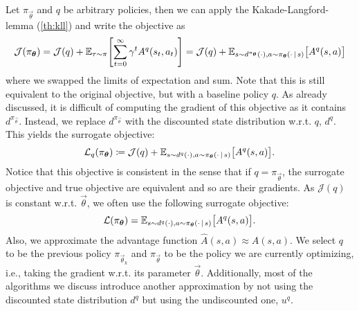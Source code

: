 		Let \(\pi_{\vec{\theta}}\) and \(q\) be arbitrary policies, then we can apply the Kakade-Langford-lemma (\autoref{th:kll}) and write the objective as
		\begin{equation}
			\mathcal{J}(\pi_{\bm{\theta}})
			= \mathcal{J}(q) + \mathbb{E}_{\tau \sim \pi}\Biggl[ \sum_{t = 0}^{\infty} \gamma^t A^q(s_t, a_t) \Biggr]
			= \mathcal{J}(q) + \mathbb{E}_{s \sim d^{\pi_{\bm{\theta}}}(\cdot), a \sim \pi_{\bm{\theta}}(\cdot \,\vert\, s)}\bigl[ A^q(s, a) \bigr]
		\end{equation}
		where we swapped the limits of expectation and sum. Note that this is still equivalent to the original objective, but with a baseline policy \(q\). As already discussed, it is difficult of computing the gradient of this objective as it contains \(d^{\pi_{\vec{\theta}}}\). Instead, we replace \(d^{\pi_{\vec{\theta}}}\) with the discounted state distribution w.r.t. \(q\), \(d^q\). This yields the surrogate objective:
		\begin{equation}
			\mathcal{L}_q(\pi_{\bm{\theta}}) \coloneqq \mathcal{J}(q) + \mathbb{E}_{s \sim d^q(\cdot), a \sim \pi_{\bm{\theta}}(\cdot \,\vert\, s)}\bigl[ A^q(s, a) \bigr].
		\end{equation}
		Notice that this objective is consistent in the sense that if \(q = \pi_{\vec{\theta}}\), the surrogate objective and true objective are equivalent and so are their gradients. As \(\mathcal{J}(q)\) is constant w.r.t. \(\vec{\theta}\), we often use the following surrogate objective:
		\begin{equation}
			\mathcal{L}(\pi_{\bm{\theta}}) = \mathbb{E}_{s \sim d^q(\cdot), a \sim \pi_{\bm{\theta}}(\cdot \,\vert\, s)}\bigl[ A^q(s, a) \bigr].
		\end{equation}
		Also, we approximate the advantage function \( \hat{A}(s, a) \approx A(s, a) \). We select \(q\) to be the previous policy \(\pi_{\vec{\theta}_k}\) and \(\pi_{\vec{\theta}}\) to be the policy we are currently optimizing, i.e., taking the gradient w.r.t. its parameter \(\vec{\theta}\). Additionally, most of the algorithms we discuss introduce another approximation by not using the discounted state distribution \(d^q\) but using the undiscounted one, \(u^q\).

